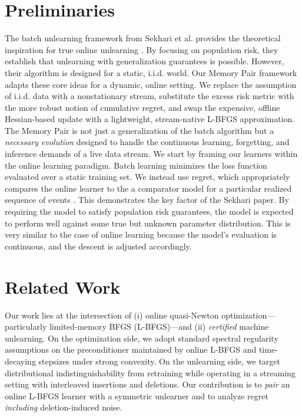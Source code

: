 \documentclass{article}
\theoremstyle{ssltheorem}
\begin{document}
\section{Preliminaries}
\label{sec:prelim}

The batch unlearning framework from Sekhari et al. provides the theoretical inspiration for true online unlearning \cite{Sekhari_Acharya_Kamath_Suresh_2021-03}.
By focusing on population risk, they establish that unlearning with generalization guarantees is possible.
However, their algorithm is designed for a static, i.i.d. world.
Our Memory Pair framework adapts these core ideas for a dynamic, online setting. We replace the assumption of i.i.d.
data with a nonstationary stream, substitute the excess risk metric with the more robust notion of cumulative regret, and swap the expensive, offline Hessian-based update with a lightweight, stream-native L-BFGS approximation\cite{mokhtari2015online}.
The Memory Pair is not just a generalization of the batch algorithm but a \textit{necessary evolution} designed to handle the continuous learning, forgetting, and inference demands of a live data stream.
We start by framing our learners within the online learning paradigm.
Batch learning  minimizes the loss function evaluated over a static training set.
We instead use regret, which appropriately compares the online learner to the a comparator model for a particular realized sequence of events \cite{Cesa-Bianchi_Lugosi_2006}.
This demonstrates the key factor of the Sekhari paper. By requiring the model to satisfy population risk guarantees, the model is expected to perform well against some true but unknown parameter distribution.
This is very similar to the case of online learning because the model's evaluation is continuous, and the descent is adjusted accordingly.
\section{Related Work}

Our work lies at the intersection of (i) online quasi-Newton optimization—particularly limited-memory BFGS (L-BFGS)—and (ii) \emph{certified} machine unlearning.
On the optimization side, we adopt standard spectral regularity assumptions on the preconditioner maintained by online L-BFGS and time-decaying stepsizes under strong convexity.
On the unlearning side, we target distributional indistinguishability from retraining while operating in a streaming setting with interleaved insertions and deletions.
Our contribution is to \emph{pair} an online L-BFGS learner with a symmetric unlearner and to analyze regret \emph{including} deletion-induced noise.
\end{document}
